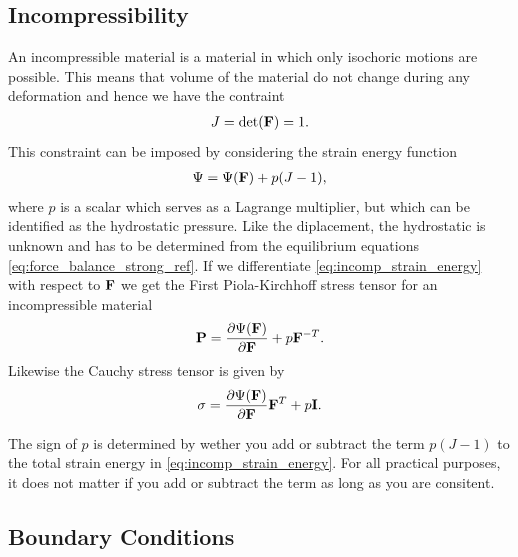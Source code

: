 \subsection{Incompressibility}
\label{sec:incompressibility}
An incompressible material is a material in which only isochoric
motions are possible. This means that volume of the material do not
change during any deformation and hence we have the contraint
\begin{align}
  J = \det(\mathbf{F}) = 1.
\end{align}
This constraint can be imposed by considering the strain energy
function
\begin{align}
  \Psi = \Psi(\mathbf{F}) + p(J-1),
  \label{eq:incomp_strain_energy}
\end{align}
where $p$ is a scalar which serves as a Lagrange multiplier, but which
can be identified as the hydrostatic pressure. Like the diplacement,
the hydrostatic is unknown and has to be determined from the equilibrium
equations \eqref{eq:force_balance_strong_ref}. If we differentiate
\eqref{eq:incomp_strain_energy} with respect to $\mathbf{F}$ we get the First
Piola-Kirchhoff stress tensor for an incompressible material
\begin{align}
  \mathbf{P} = \frac{\partial \Psi(\mathbf{F})}{\partial \mathbf{F}} + p \mathbf{F}^{-T}.
\end{align}
Likewise the Cauchy stress tensor is given by
\begin{align}
  \mathbf{\sigma} = \frac{\partial \Psi(\mathbf{F})}{\partial \mathbf{F}}\mathbf{F}^{T} + p \mathbf{I}.
  \label{eq:cauchy_incomp}
\end{align}


\begin{remark}
  The sign of $p$ is determined by wether you add or subtract the term
  $ p(J-1)$ to the total strain energy in
  \eqref{eq:incomp_strain_energy}. For all practical purposes, it
  does not matter if you add or subtract the term as long as you are
  consitent. 
\end{remark}




\subsection{Boundary Conditions}
\label{sec:mech_boudary}


